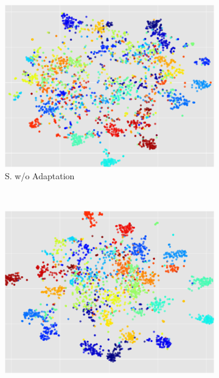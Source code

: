 

  
\begin{figure}[ht]
    \begin{subfigure}[t]{0.25\textwidth}
        \includegraphics[width=\textwidth]{before_c_s_c}
        \caption{S. w/o Adaptation}
        \label{fig:gull}
    \end{subfigure}~\begin{subfigure}[t]{0.25\textwidth}
        \includegraphics[width=\textwidth]{after_c_s_c}

\end{subfigure}
\end{figure}
